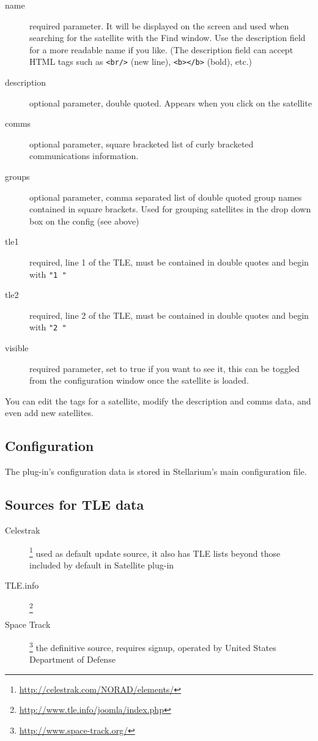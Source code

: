 \begin{description}
\item[name] required parameter. It will be displayed on the screen and used
when searching for the satellite with the Find window. Use the
description field for a more readable name if you like. (The
description field can accept HTML tags such as \texttt{<br/>} (new line), \texttt{<b></b>} (bold), etc.)

\item[description] optional parameter, double quoted. Appears when you click on the satellite
\item[comms] optional parameter, square bracketed list of curly bracketed communications information.
\item[groups]  optional parameter, comma separated list of double quoted group names contained in square brackets. Used for grouping satellites in the drop down box on the config (see above)
\item[tle1]  required, line 1 of the TLE, must be contained in double quotes and begin with \texttt{"1~"}
\item[tle2]  required, line 2 of the TLE, must be contained in double quotes and begin with \texttt{"2~"}
\item[visible]  required parameter, set to true if you want to see it, this can be toggled from the configuration window once the satellite is loaded. 
\end{description}
You can edit the tags for a satellite, modify the description and comms data, and even add new satellites. 


\subsection{Configuration}
\label{sec:plugins:Satellites:configuration}


The plug-in's configuration data is stored in Stellarium's main configuration
file.


\subsection{Sources for TLE data}

\begin{description}
\item[Celestrak]\footnote{\url{http://celestrak.com/NORAD/elements/}} used as default update source, it also has TLE lists
  beyond those included by default in Satellite plug-in
\item[TLE.info]\footnote{\url{http://www.tle.info/joomla/index.php}}
\item[Space Track]\footnote{\url{http://www.space-track.org/}} the definitive source, requires signup, operated by
  United States Department of Defense
\end{description}


